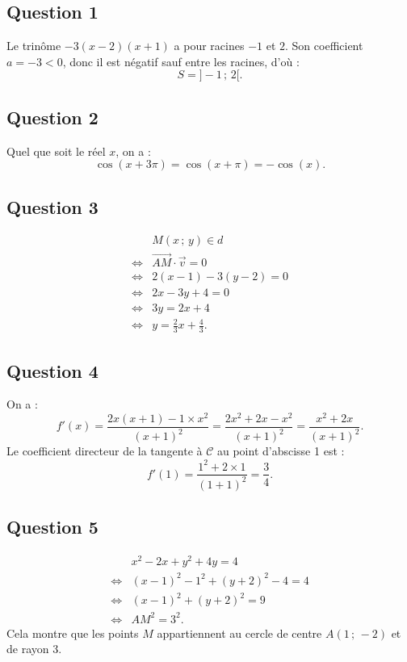 \subsection*{Question 1}

Le trinôme \(-3(x - 2)(x + 1)\) a pour racines \(-1\) et \(2\). Son coefficient \(a = -3 < 0\), donc il est négatif sauf entre les racines, d'où :
\[
S = ]-1 \,;\, 2[.
\]

\subsection*{Question 2}

Quel que soit le réel \(x\), on a :
\[
\cos(x + 3\pi) = \cos(x + \pi) = -\cos(x).
\]

\subsection*{Question 3}

\begin{align*}
&M(x\,;\,y) \in \textit{d} \\
\iff &\overrightarrow{AM} \cdot \vec{v} = 0 \\
\iff &2(x - 1) - 3(y - 2) = 0 \\
\iff &2x - 3y + 4 = 0 \\
\iff &3y = 2x + 4 \\
\iff &y = \frac{2}{3}x + \frac{4}{3}.
\end{align*}

\subsection*{Question 4}

On a :
\[
f'(x) = \frac{2x(x + 1) - 1 \times x^2}{(x + 1)^2} = \frac{2x^2 + 2x - x^2}{(x + 1)^2} = \frac{x^2 + 2x}{(x + 1)^2}.
\]
Le coefficient directeur de la tangente à \(\mathcal{C}\) au point d'abscisse 1 est :
\[
f'(1) = \frac{1^2 + 2 \times 1}{(1 + 1)^2} = \frac{3}{4}.
\]

\subsection*{Question 5}

\begin{align*}
&x^2 - 2x + y^2 + 4y = 4 \\
\iff &(x - 1)^2 - 1^2 + (y + 2)^2 - 4 = 4 \\
\iff &(x - 1)^2 + (y + 2)^2 = 9 \\
\iff &AM^2 = 3^2.
\end{align*}
Cela montre que les points \( M \) appartiennent au cercle de centre \( A(1\,;\,-2) \) et de rayon 3.
